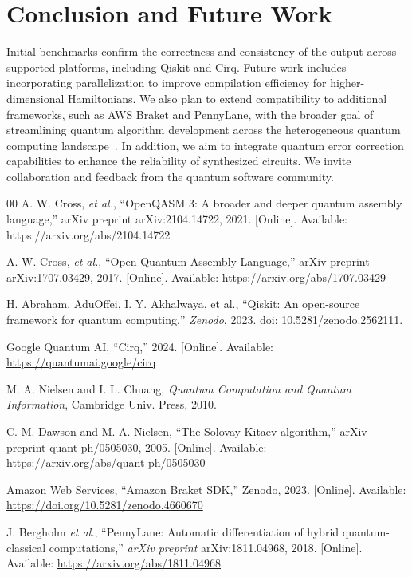 \documentclass[conference]{IEEEtran}
\begin{document}
    \section{Conclusion and Future Work}\label{sec:conclusion-and-future-work}
    Initial benchmarks confirm the correctness and consistency of the output across supported platforms, including Qiskit and Cirq.
    Future work includes incorporating parallelization to improve compilation efficiency for higher-dimensional Hamiltonians.
    We also plan to extend compatibility to additional frameworks, such as AWS Braket and PennyLane,
    with the broader goal of streamlining quantum algorithm development across the heterogeneous quantum computing landscape~\cite{braket-zenodo,pennylane}.
    In addition, we aim to integrate quantum error correction capabilities to enhance the reliability of synthesized circuits.
    We invite collaboration and feedback from the quantum software community.

    \begin{thebibliography}{00}
        A. W. Cross, \textit{et al.}, ``OpenQASM 3: A broader and deeper quantum
        assembly language,'' arXiv preprint arXiv:2104.14722, 2021. [Online]. Available: https://arxiv.org/abs/2104.14722

        A. W. Cross, \textit{et al.}, ``Open Quantum Assembly Language,'' arXiv preprint arXiv:1707.03429, 2017. [Online]. Available: https://arxiv.org/abs/1707.03429

        H. Abraham, AduOffei, I. Y. Akhalwaya, et al.,
        “Qiskit: An open-source framework for quantum computing,”
        \textit{Zenodo}, 2023. doi: 10.5281/zenodo.2562111.

        Google Quantum AI, “Cirq,” 2024. [Online]. Available: \url{https://quantumai.google/cirq}

        M. A. Nielsen and I. L. Chuang, \textit{Quantum Computation and Quantum Information}, Cambridge Univ. Press, 2010.

        C. M. Dawson and M. A. Nielsen, “The Solovay-Kitaev algorithm,”
        arXiv preprint quant-ph/0505030, 2005. [Online]. Available: \url{https://arxiv.org/abs/quant-ph/0505030}

        Amazon Web Services, ``Amazon Braket SDK,'' Zenodo, 2023. [Online]. Available: \url{https://doi.org/10.5281/zenodo.4660670}

        J. Bergholm \textit{et al.}, ``PennyLane: Automatic differentiation of hybrid quantum-classical computations,''
        \emph{arXiv preprint} arXiv:1811.04968, 2018. [Online]. Available: \url{https://arxiv.org/abs/1811.04968}
    \end{thebibliography}
\end{document}
